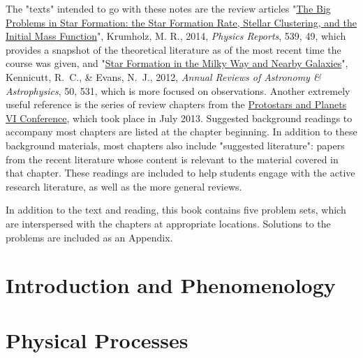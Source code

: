 \documentclass[twoside]{tex/tufte-book} %
\begin{document}
The "texts" intended to go with these notes are the review articles "\href{http://adsabs.harvard.edu/abs/2014PhR...539...49K}{The Big Problems in Star Formation: the Star Formation Rate, Stellar Clustering, and the Initial Mass Function}", Krumholz, M. R., 2014, \textit{Physics Reports}, 539, 49, which provides a snapshot of the theoretical literature as of the most recent time the course was given, and "\href{http://adsabs.harvard.edu/abs/2012ARA\%26A..50..531K}{Star Formation in the Milky Way and Nearby Galaxies}", Kennicutt, R.~C., \& Evans, N.~J., 2012, \textit{Annual Reviews of Astronomy \& Astrophysics}, 50, 531, which is more focused on observations. Another extremely useful reference is the series of review chapters from the \href{http://www.mpia.de/homes/ppvi/}{Protostars and Planets VI Conference}, which took place in July 2013. Suggested background readings to accompany most chapters are listed at the chapter beginning. In addition to these background materials, most chapters also include "suggested literature": papers from the recent literature whose content is relevant to the material covered in that chapter. These readings are included to help students engage with the active research literature, as well as the more general reviews.

In addition to the text and reading, this book contains five problem sets, which are interspersed with the chapters at appropriate locations. Solutions to the problems are included as an Appendix.


\setcounter{secnumdepth}{3}

\mainmatter


\part{Introduction and Phenomenology}




\part{Physical Processes}
\end{document}
